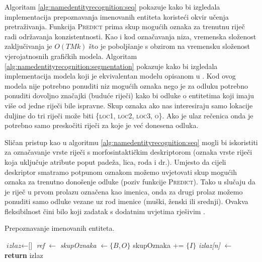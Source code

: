 Algoritam \ref{alg:namedentityrecognition:seq} pokazuje kako bi izgledala
implementacija prepoznavanja imenovanih entiteta koristeći okvir učenja
pretraživanja. Funkcija \textsc{Predict} prima skup mogućih oznaka za trenutnu
riječ radi održavanja konzistentnosti. Kao i kod označavanja niza, vremenska
složenost zaključivanja je $O(T M k)$ što je poboljšanje s obzirom na vremensku
složenost vjerojatnosnih grafičkih modela. Algoritam
\ref{alg:namedentityrecognition:segmentation} pokazuje kako bi izgledala
implementacija modela koji je ekvivalentan modelu opisanom u
\citep{sarawagi2004semi}. Kod ovog modela nije potrebno ponuditi niz mogućih
oznaka nego je za odluku potrebno ponuditi dovoljno značajki (buduće riječi)
kako bi odluke o entitetima koji imaju više od jedne riječi bile ispravne. Skup
oznaka ako nas interesiraju samo lokacije duljine do tri riječi može biti
\{\textsc{loc1}, \textsc{loc2}, \textsc{loc3}, \textsc{o}\}. Ako je ulaz
rečenica onda je potrebno samo preskočiti riječi za koje je već donesena odluka.

Sličan pristup kao u algoritmu \ref{alg:namedentityrecognition:seq} mogli bi
iskoristiti za označavanje vrste riječi s morfosintaktičkim deskriptorom (oznaka
vrste riječi koja uključuje atribute poput padeža, lica, roda i dr.). Umjesto da
cijeli deskriptor smatramo potpunom oznakom možemo uvjetovati skup mogućih
oznaka za trenutno donošenje odluke (poziv funkcije \textsc{Predict}). Tako u
slučaju da je riječ u prvom prolazu označena kao imenica, onda za drugi prolaz
možemo ponuditi samo odluke vezane uz rod imenice (muški, ženski ili srednji).
Ovakva fleksibilnost čini bilo koji zadatak s dodatnim uvjetima
 rješivim \citep{chang2012structured}.

\begin{algorithm}[H]
\caption{Prepoznavanje imenovanih entiteta.}
\label{alg:namedentityrecognition:seq}
\begin{algorithmic}[1]
\State $\textit{izlaz} \gets \text{[]}$
  \State \textit{ref} $\gets$ 
  \State \textit{skupOznaka} $\gets \{B,O\}$
    \State skupOznaka += $\{I\}$
  \EndIf
  \State \textit{izlaz[n]} $\gets$ 
\EndFor
\State {}
\State \textbf{return} izlaz
\EndFunction
\end{algorithmic}
\end{algorithm}

